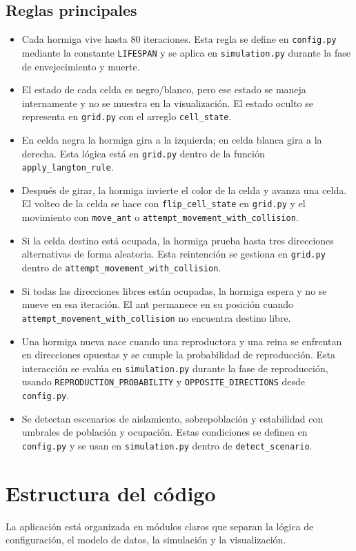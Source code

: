 \documentclass[12pt,a4paper]{article}
\begin{document}
\subsection{Reglas principales}
\begin{itemize}
  \item Cada hormiga vive hasta 80 iteraciones. Esta regla se define en \texttt{config.py} mediante la constante \texttt{LIFESPAN} y se aplica en \texttt{simulation.py} durante la fase de envejecimiento y muerte.
  \item El estado de cada celda es negro/blanco, pero ese estado se maneja internamente y no se muestra en la visualización. El estado oculto se representa en \texttt{grid.py} con el arreglo \texttt{cell_state}.
  \item En celda negra la hormiga gira a la izquierda; en celda blanca gira a la derecha. Esta lógica está en \texttt{grid.py} dentro de la función \texttt{apply_langton_rule}.
  \item Después de girar, la hormiga invierte el color de la celda y avanza una celda. El volteo de la celda se hace con \texttt{flip_cell_state} en \texttt{grid.py} y el movimiento con \texttt{move_ant} o \texttt{attempt_movement_with_collision}.
  \item Si la celda destino está ocupada, la hormiga prueba hasta tres direcciones alternativas de forma aleatoria. Esta reintención se gestiona en \texttt{grid.py} dentro de \texttt{attempt_movement_with_collision}.
  \item Si todas las direcciones libres están ocupadas, la hormiga espera y no se mueve en esa iteración. El ant permanece en su posición cuando \texttt{attempt_movement_with_collision} no encuentra destino libre.
  \item Una hormiga nueva nace cuando una reproductora y una reina se enfrentan en direcciones opuestas y se cumple la probabilidad de reproducción. Esta interacción se evalúa en \texttt{simulation.py} durante la fase de reproducción, usando \texttt{REPRODUCTION_PROBABILITY} y \texttt{OPPOSITE_DIRECTIONS} desde \texttt{config.py}.
  \item Se detectan escenarios de aislamiento, sobrepoblación y estabilidad con umbrales de población y ocupación. Estas condiciones se definen en \texttt{config.py} y se usan en \texttt{simulation.py} dentro de \texttt{detect_scenario}.
\end{itemize}

\section{Estructura del código}
La aplicación está organizada en módulos claros que separan la lógica de configuración, el modelo de datos, la simulación y la visualización.
\end{document}
